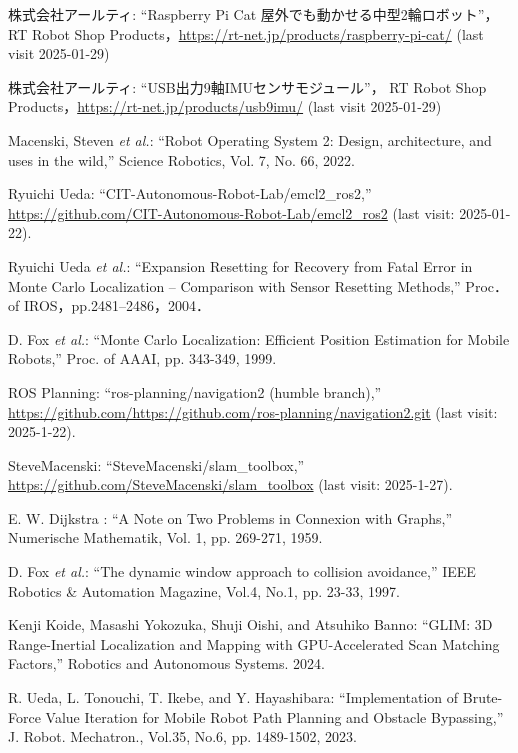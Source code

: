 \documentclass[twocolumn,9pt]{jsproceedings}
\begin{document}
\footnotesize
\begin{thebibliography}{99}

  株式会社アールティ: ``Raspberry Pi Cat 屋外でも動かせる中型2輪ロボット''，
  RT Robot Shop Products，\url{https://rt-net.jp/products/raspberry-pi-cat/} (last visit 2025-01-29)
  
  株式会社アールティ: ``USB出力9軸IMUセンサモジュール''，
  RT Robot Shop Products，\url{https://rt-net.jp/products/usb9imu/} (last visit 2025-01-29)

  Macenski, Steven {\it et al.}: ``Robot Operating System 2: Design, architecture, and uses in the wild,''
  Science Robotics, Vol. 7, No. 66, 2022.

  Ryuichi Ueda: ``CIT-Autonomous-Robot-Lab/emcl2\_ros2,'' \url{https://github.com/CIT-Autonomous-Robot-Lab/emcl2_ros2} (last visit: 2025-01-22).
  
  Ryuichi Ueda {\it et al.}: 
  ``Expansion Resetting for Recovery from Fatal Error in Monte Carlo Localization -- Comparison with Sensor Resetting Methods,'' Proc．of IROS，pp.2481--2486，2004．
  
  D. Fox {\it et al.}: ``Monte Carlo Localization: Efficient Position Estimation for Mobile Robots,''
  Proc. of AAAI, pp. 343-349, 1999.
  
  ROS Planning: ``ros-planning/navigation2 (humble branch),'' \url{https://github.com/https://github.com/ros-planning/navigation2.git} (last visit: 2025-1-22).

  SteveMacenski: ``SteveMacenski/slam\_toolbox,'' \url{https://github.com/SteveMacenski/slam_toolbox} (last visit: 2025-1-27).

  E. W. Dijkstra : ``A Note on Two Problems in Connexion with Graphs,''
  Numerische Mathematik, Vol. 1, pp. 269-271, 1959.

	D. Fox {\it et al.}: ``The dynamic window approach to collision avoidance,'' 
	IEEE Robotics \& Automation Magazine, Vol.4, No.1, pp. 23-33, 1997.

  Kenji Koide, Masashi Yokozuka, Shuji Oishi, and Atsuhiko Banno: ``GLIM: 3D Range-Inertial Localization and Mapping with GPU-Accelerated Scan Matching Factors,''
  Robotics and Autonomous Systems. 2024.

  R. Ueda, L. Tonouchi, T. Ikebe, and Y. Hayashibara: ``Implementation of Brute-Force Value Iteration for Mobile Robot Path Planning and Obstacle Bypassing,''
  J. Robot. Mechatron., Vol.35, No.6, pp. 1489-1502, 2023.


\end{thebibliography}
\end{document}
